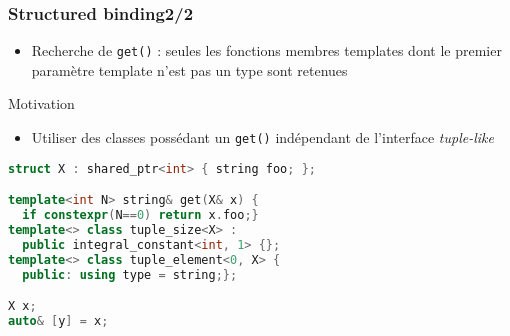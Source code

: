 \documentclass[C++.tex]{subfiles}
\begin{document}
\begin{frame}[fragile]
	\frametitle{Structured binding\titlehfill{}2/2}
	\begin{itemize}
		\item Recherche de \lstinline|get()| : seules les fonctions membres templates dont le premier paramètre template n'est pas un type sont retenues
	\end{itemize}

	\begin{block}{Motivation}
		\begin{itemize}
			\item Utiliser des classes possédant un \lstinline|get()| indépendant de l'interface \textit{tuple-like}
		\end{itemize}
	\end{block}

	\begin{lstlisting}[language=C++]
struct X : shared_ptr<int> { string foo; };

template<int N> string& get(X& x) { 
  if constexpr(N==0) return x.foo;}
template<> class tuple_size<X> : 
  public integral_constant<int, 1> {};
template<> class tuple_element<0, X> {
  public: using type = string;};

X x;
auto& [y] = x;\end{lstlisting}

\end{frame}
\end{document}

